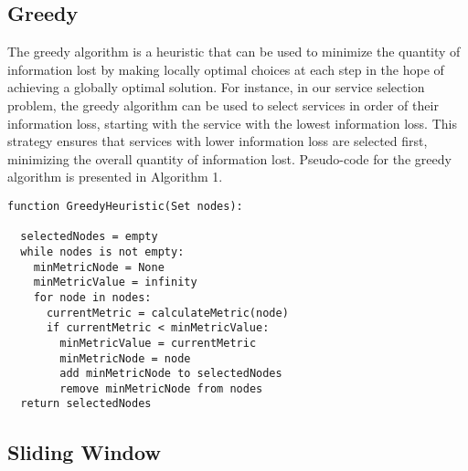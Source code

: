 \subsection*{Greedy}
The greedy algorithm is a heuristic that can be used to minimize the quantity of information lost by making locally optimal choices at each step in the hope of achieving a globally optimal solution.
For instance, in our service selection problem, the greedy algorithm can be used to select services in order of their information loss, starting with the service with the lowest information loss.
This strategy ensures that services with lower information loss are selected first, minimizing the overall quantity of information lost.
Pseudo-code for the greedy algorithm is presented in Algorithm 1.
\begin{lstlisting}[frame=single,caption={Greedy Heuristic Pseudocode},label={lst:greedy}]
function GreedyHeuristic(Set nodes):

  selectedNodes = empty
  while nodes is not empty:
    minMetricNode = None
    minMetricValue = infinity
    for node in nodes:
      currentMetric = calculateMetric(node)
      if currentMetric < minMetricValue:
        minMetricValue = currentMetric
        minMetricNode = node
        add minMetricNode to selectedNodes
        remove minMetricNode from nodes
  return selectedNodes
        \end{lstlisting}

\subsection*{Sliding Window}

